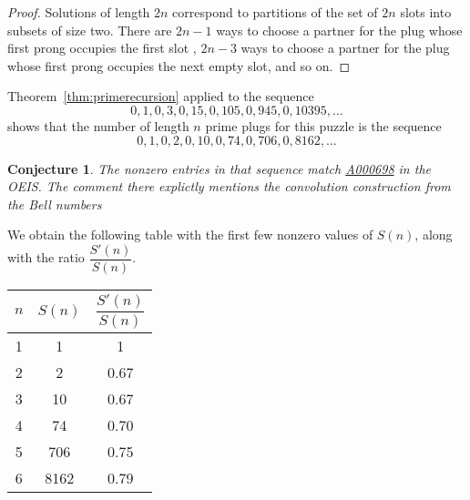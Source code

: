 \documentclass[10pt]{article}
\newtheorem{conjecture}[theorem]{Conjecture}
\numberwithin{equation}{section}
\newenvironment{anote}
               {{\textcolor{blue}{Note:}}
                 \itshape
               }
               {}
\begin{document}
\begin{proof}
Solutions of length $2n$ correspond to   partitions of the set of $2n$ slots into subsets of size two. There are $2n-1$ ways to choose a partner for the plug whose first prong occupies the first slot , $2n-3$ ways to choose a partner for the plug whose first prong occupies the next empty slot, and so on. 
\end{proof}


\begin{comment}
This is wrong but keeping for the LaTex when I rewrite: Note that the exponential generating function for $t(n) = \sum _{i} \dfrac{t(i)}{i!}x^i= e^{\frac{x^2}{2}}$.


\begin{anote}
Probably in a paper, the above would just be referenced, but here's more on this for us. Look at the expansion $e^{\frac{x^2}{2}}= 1+ \dfrac{(\dfrac{x^2}{2})^1}{1!}+\dfrac{(\dfrac{x^2}{2})^2}{2!}+\dfrac{(\dfrac{x^2}{2})^3}{3!}+\cdots $  OK, I need to think about how to explain this better.... want to write up other parts now, but will go back to it later. Also I think I'm using the wrong latex commands for some of these, they don't look so good...
\end{anote} 
\end{comment}


Theorem~\ref{thm:primerecursion} applied to the sequence
\begin{equation*}
    0, 1, 0, 3, 0, 15, 0, 105, 0, 945, 0, 10395, \ldots
\end{equation*} 
shows that the number of length $n$ prime plugs for this puzzle is the sequence
\begin{equation*}
    0, 1, 0, 2, 0, 10,  0, 74, 0, 706, 0, 8162, \ldots 
\end{equation*}

\begin{conjecture}
The nonzero entries in that sequence match \href{https:oeis.org/A000698}{A000698} in the OEIS. The comment there explictly mentions the convolution construction from the Bell numbers 
\end{conjecture}

We obtain the following table with the first few nonzero values of $S(n)$, along with the ratio $\dfrac{S'(n)}{S(n)}$.

\begin{center}
\begin{tabular}{ |c|c|c| } 
 \hline
 $n$ & $S(n) $ & $\dfrac{S'(n)}{S(n)}$ \\ 
 \hline
 1 & 1 & 1 \\ 
 2 & 2 & 0.67 \\ 
 3 & 10 & 0.67 \\ 
 4 & 74 & 0.70 \\ 
 5 & 706 & 0.75 \\ 
6 & 8162 & 0.79 \\ 
 \hline
\end{tabular}
\end{center}
\end{document}

